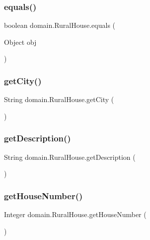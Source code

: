 \subsubsection{\texorpdfstring{equals()}{equals()}}
{\footnotesize\ttfamily boolean domain.\+Rural\+House.\+equals (\begin{DoxyParamCaption}\item[{Object}]{obj }\end{DoxyParamCaption})}

\mbox{\label{classdomain_1_1_rural_house_a67a45aa0b441b32d455d58c4a42446f1}} 
\subsubsection{\texorpdfstring{getCity()}{getCity()}}
{\footnotesize\ttfamily String domain.\+Rural\+House.\+get\+City (\begin{DoxyParamCaption}{ }\end{DoxyParamCaption})}

\mbox{\label{classdomain_1_1_rural_house_a21b3359aa62984046a4da490fe8895e1}} 
\subsubsection{\texorpdfstring{getDescription()}{getDescription()}}
{\footnotesize\ttfamily String domain.\+Rural\+House.\+get\+Description (\begin{DoxyParamCaption}{ }\end{DoxyParamCaption})}

\mbox{\label{classdomain_1_1_rural_house_a849faba68dc8c0a71ed936bc509f5568}} 
\subsubsection{\texorpdfstring{getHouseNumber()}{getHouseNumber()}}
{\footnotesize\ttfamily Integer domain.\+Rural\+House.\+get\+House\+Number (\begin{DoxyParamCaption}{ }\end{DoxyParamCaption})}

